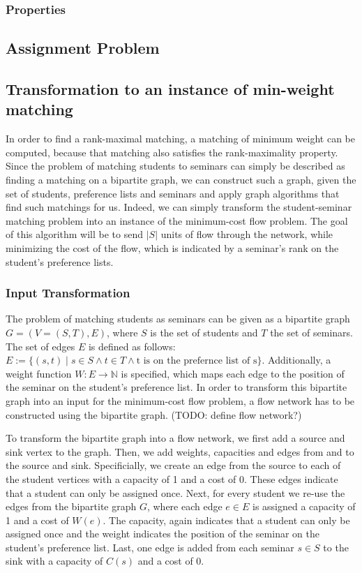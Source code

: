 \subsubsection{Properties}

\subsection{Assignment Problem}

\subsection{Transformation to an instance of min-weight matching}
In order to find a rank-maximal matching, a matching of minimum weight can be computed, because that matching also satisfies the rank-maximality property. Since the problem of matching students to seminars can simply be described as finding a matching on a bipartite graph, we can construct such a graph, given the set of students, preference lists and seminars and apply graph algorithms that find such matchings for us. 
\newline
Indeed, we can simply transform the student-seminar matching problem into an instance of the minimum-cost flow problem. The goal of this algorithm will be to send $|S|$ units of flow through the network, while minimizing the cost of the flow, which is indicated by a seminar's rank on the student's preference lists.

\subsubsection{Input Transformation}
The problem of matching students as seminars can be given as a bipartite graph $G=(V=(S, T), E)$, where $S$ is the set of students and $T$ the set of seminars. The set of edges $E$ is defined as follows: $E:= \{(s, t) \mid s \in S \land t \in T \land \mbox{t is on the prefernce list of s}\}$. Additionally, a weight function $W: E \rightarrow  \mathbb{N}$ is specified, which maps each edge to the position of the seminar on the student's preference list. In order to transform this bipartite graph into an input for the minimum-cost flow problem, a flow network has to be constructed using the bipartite graph. (TODO: define flow network?) 

To transform the bipartite graph into a flow network, we first add a source and sink vertex to the graph. Then, we add weights, capacities and edges from and to the source and sink. Specificially, we create an edge from the source to each of the student vertices with a capacity of 1 and a cost of 0. These edges indicate that a student can only be assigned once. Next, for every student we re-use the edges from the bipartite graph $G$, where each edge $e \in E$ is assigned a capacity of 1 and a cost of $W(e)$. The capacity, again indicates that a student can only be assigned once and the weight indicates the position of the seminar on the student's preference list. Last, one edge is added from each seminar $s \in S$ to the sink with a capacity of $C(s)$ and a cost of 0. 

